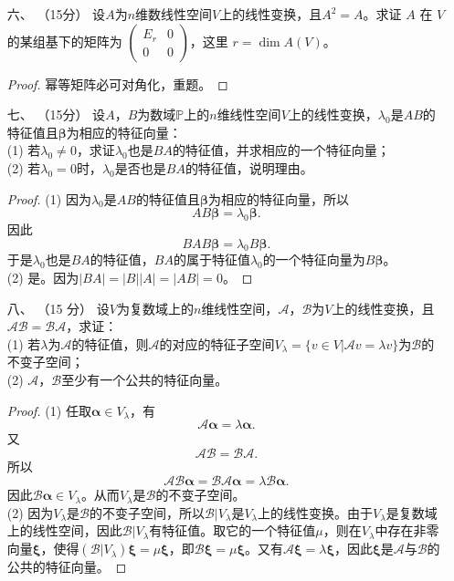 \begin{enumerate}[1~]
\item[六、]（15分）
设$A$为$n$维数线性空间$V$上的线性变换，且$A^2=A$。求证 $A$ 在 $V$ 的某组基下的矩阵为 $\left(\begin{smallmatrix} { E _ { r } } & { 0 } \\ { 0 } & { 0 } \end{smallmatrix} \right)$，这里 $r = \operatorname{dim} A (V)$。

\begin{proof}
幂等矩阵必可对角化，重题。
\end{proof}

\item[七、]（15分）
设$A$，$B$为数域$\mathbb{P}$上的$n$维线性空间$V$上的线性变换，$\lambda _ { 0 }$是$AB$的特征值且$\boldsymbol{\beta}$为相应的特征向量：\\
(1) 若$\lambda _ { 0 } \ne 0$，求证$\lambda _ { 0 }$也是$BA$的特征值，并求相应的一个特征向量；\\
(2) 若$\lambda _ { 0 } = 0$时，$\lambda _ { 0 }$是否也是$BA$的特征值，说明理由。
\begin{proof}
(1) 因为$\lambda _ { 0 }$是$AB$的特征值且$\boldsymbol{\beta}$为相应的特征向量，所以\[
AB\boldsymbol{\beta}=\lambda_0\boldsymbol{\beta}.
\]
因此\[
BAB\boldsymbol{\beta}=\lambda_0B\boldsymbol{\beta}.
\]
于是$\lambda _ { 0 }$也是$BA$的特征值，$BA$的属于特征值$\lambda_0$的一个特征向量为$B\boldsymbol{\beta}$。\\
(2) 是。因为$|BA|=|B||A|=|AB|=0$。
\end{proof}

\item[八、]（15 分）
设$V$为复数域上的$n$维线性空间，$\mathscr{A}$，$\mathscr{B}$为$V$上的线性变换，且$\mathscr{A}\mathscr{B}=\mathscr{B}\mathscr{A}$，求证：\\
(1) 若$\lambda$为$\mathscr{A}$的特征值，则$\mathscr{A}$的对应的特征子空间$V_{\lambda}=\{v\in V|\mathscr{A}v=\lambda v\}$为$\mathscr{B}$的不变子空间；\\
(2) $\mathscr{A}$，$\mathscr{B}$至少有一个公共的特征向量。
\begin{proof}
(1) 任取$\boldsymbol{\alpha}\in V_{\lambda}$，有\[
\mathscr{A}\boldsymbol{\alpha}=\lambda\boldsymbol{\alpha}.
\]
又\[
\mathscr{A}\mathscr{B}=\mathscr{B}\mathscr{A}.
\]
所以\[
\mathscr{A}\mathscr{B}\boldsymbol{\alpha}=\mathscr{B}\mathscr{A}\boldsymbol{\alpha}=\lambda \mathscr{B}\boldsymbol{\alpha}.
\]
因此$\mathscr{B}\boldsymbol{\alpha}\in V_{\lambda}$。从而$V_{\lambda}$是$\mathscr{B}$的不变子空间。\\
(2) 因为$V_{\lambda}$是$\mathscr{B}$的不变子空间，所以$\mathscr{B}|V_{\lambda}$是$V_{\lambda}$上的线性变换。由于$V_{\lambda}$是复数域上的线性空间，因此$\mathscr{B}|V_{\lambda}$有特征值。取它的一个特征值$\mu$，则在$V_{\lambda}$中存在非零向量$\boldsymbol{\xi}$，使得$(\mathscr{B}|V_{\lambda})\boldsymbol{\xi}=\mu\boldsymbol{\xi}$，即$\mathscr{B}\boldsymbol{\xi}=\mu\boldsymbol{\xi}$。又有$\mathscr{A}\boldsymbol{\xi}=\lambda\boldsymbol{\xi}$，因此$\boldsymbol{\xi}$是$\mathscr{A}$与$\mathscr{B}$的公共的特征向量。
\end{proof}


\end{enumerate}
